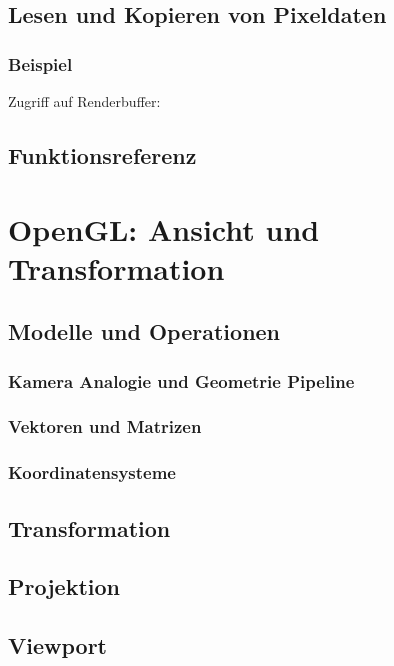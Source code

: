 \section{Lesen und Kopieren von Pixeldaten}
\subsection*{Beispiel}
Zugriff auf Renderbuffer:

\section{Funktionsreferenz}

\chapter{OpenGL: Ansicht und Transformation}

\section{Modelle und Operationen}

\subsection{Kamera Analogie und Geometrie Pipeline}
\subsection{Vektoren und Matrizen}
\subsection{Koordinatensysteme}

\section{Transformation}

\section{Projektion}

\section{Viewport}


